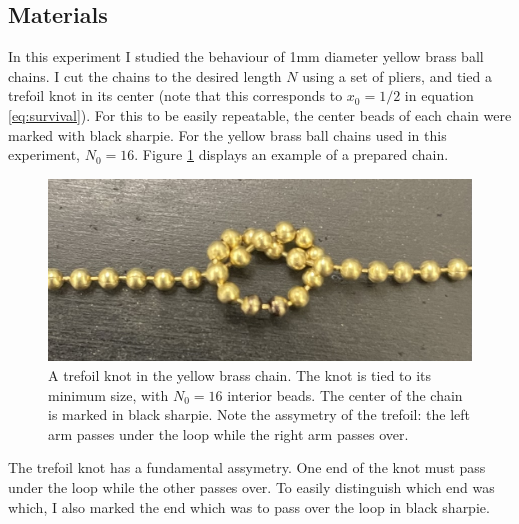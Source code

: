 \documentclass[11pt]{article}
\begin{document}
\subsection{Materials}
    In this experiment I studied the behaviour of 1mm diameter yellow brass ball chains.
    I cut the chains to the desired length $N$ using a set of pliers, and tied a trefoil
    knot in its center (note that this corresponds to $x_0=1/2$ in equation \ref{eq:survival}). 
    For this to be easily repeatable, the center beads of 
    each chain were marked with black sharpie. For the yellow brass ball chains used in
    this experiment, $N_0=16$. Figure \ref{fig:chain} displays an example of a prepared chain.\\
    \begin{figure}[H]
        \centering
        \includegraphics[scale=0.15]{chain.jpg}
        \caption{A trefoil knot in the yellow brass chain. The knot is tied to its minimum
        size, with $N_0=16$ interior beads. The center of the 
        chain is marked in black sharpie. Note the assymetry of the trefoil: the left arm 
        passes under the loop while the right arm passes over.}
        \label{fig:chain}
    \end{figure}
    The trefoil knot has a fundamental assymetry. One end of the knot must pass under the
    loop while the other passes over. To easily distinguish which end was which, I also 
    marked the end which was to pass over the loop in black sharpie.\\
\end{document}
